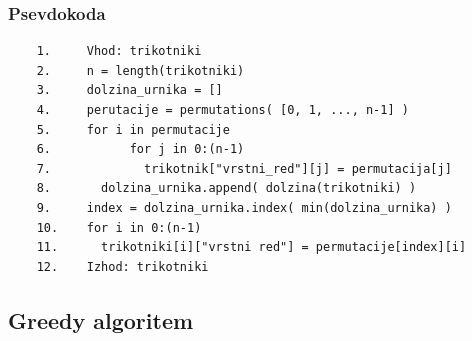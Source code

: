 \documentclass[a4paper,12pt]{article}
\theoremstyle{definition}
\theoremstyle{plain}
\begin{document}
\subsubsection{Psevdokoda}
\begin{verbatim}
    1.     Vhod: trikotniki
    2.     n = length(trikotniki)
    3.     dolzina_urnika = []
    4.     perutacije = permutations( [0, 1, ..., n-1] )
    5.     for i in permutacije
    6.           for j in 0:(n-1)
    7.             trikotnik["vrstni_red"][j] = permutacija[j]
    8.       dolzina_urnika.append( dolzina(trikotniki) )
    9.     index = dolzina_urnika.index( min(dolzina_urnika) )
    10.    for i in 0:(n-1)
    11.      trikotniki[i]["vrstni red"] = permutacije[index][i]
    12.    Izhod: trikotniki

\end{verbatim}




\subsection{Greedy algoritem}
\end{document}
